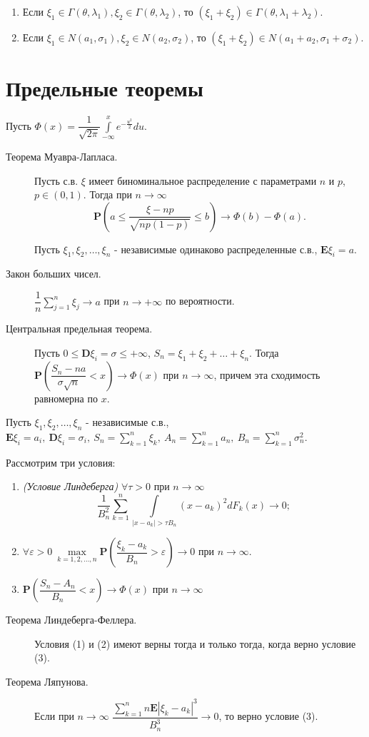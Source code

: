 \documentclass[a4paper,12pt]{scrartcl}
\newcommand{\E}{\mathbf{E}}
\newcommand{\D}{\mathbf{D}}
\newcommand{\Prb}{\mathbf{P}}
\begin{document}
\begin{enumerate}
 \item Если $\xi_1 \in \Gamma(\theta,\lambda_1),\xi_2 \in \Gamma(\theta,\lambda_2)$, то $(\xi_1+\xi_2) \in \Gamma(\theta,\lambda_1+\lambda_2)$.
 \item Если $\xi_1 \in N(a_1,\sigma_1),\xi_2 \in N(a_2,\sigma_2)$, то $(\xi_1+\xi_2) \in N(a_1+a_2,\sigma_1 + \sigma_2)$.
\end{enumerate}
\section{Предельные теоремы}

Пусть $\Phi(x) = \dfrac{1}{\sqrt{2\pi}}\int\limits_{-\infty}^{x}e^{-\frac{u^2}{2}}du$.

\begin{description}
 \item[Теорема Муавра-Лапласа.] Пусть с.в. $\xi$ имеет биноминальное распределение с параметрами $n$ и $p$,$p\in(0,1)$. Тогда при $n\to\infty$ $$\Prb\left(a \leqslant \dfrac{\xi - np}{\sqrt{np(1-p)}} \leqslant b\right) \to \Phi(b) - \Phi(a).$$

Пусть $\xi_1,\xi_2,\ldots,\xi_n$ - независимые одинаково распределенные с.в., $\E\xi_i = a$.

\item[Закон больших чисел.] $\dfrac{1}{n}\sum\limits_{j=1}^{n}\xi_j \to a$ при $n\to+\infty$ по вероятности.
\item[Центральная предельная теорема.] Пусть $0 \leqslant\D\xi_i = \sigma\leqslant +\infty$, $S_n = \xi_1 + \xi_2 +\ldots+\xi_n$. Тогда $\Prb\left(\dfrac{S_n - na}{\sigma\sqrt{n}} < x\right) \to \Phi(x)$ при $n \to \infty$, причем эта сходимость равномерна по $x$.
\end{description}

Пусть $\xi_1,\xi_2,\ldots,\xi_n$ - независимые с.в., $\E\xi_i = a_i,\ \D\xi_i = \sigma_i,\ S_n = \sum\limits_{k=1}^{n}\xi_k,\ A_n = \sum\limits_{k=1}^{n}a_n,\ B_n=\sum\limits_{k=1}^{n}\sigma_n^2$.

Рассмотрим три условия:
\begin{enumerate}
 \item \emph{(Условие Линдеберга)} $\forall \tau > 0$ при $n\to\infty$
$$ \dfrac{1}{B_n^2}\sum\limits_{k=1}^{n}\int\limits_{|x-a_k| > \tau B_n}(x-a_k)^2dF_k(x)\to0;$$
 \item $\forall \varepsilon > 0\ \max\limits_{k=1,2,\ldots,n}\Prb\left(\dfrac{\xi_k - a_k}{B_n}>\varepsilon \right)\to 0$ при $n\to\infty$.
\item$\Prb\left(\dfrac{S_n - A_n}{B_n} < x\right)\to \Phi(x)$ при $n \to \infty$
\end{enumerate}
\begin{description}
 \item [Теорема Линдеберга-Феллера.] Условия (1) и (2) имеют верны тогда и только тогда, когда верно условие (3).
 \item[Теорема Ляпунова.] Если при $n\to\infty$   $\dfrac{\sum\limits_{k=1}^{n}{n}\E|\xi_k-a_k|^3}{B_n^3}\to 0$, то верно условие (3).
\end{description}
\end{document}

